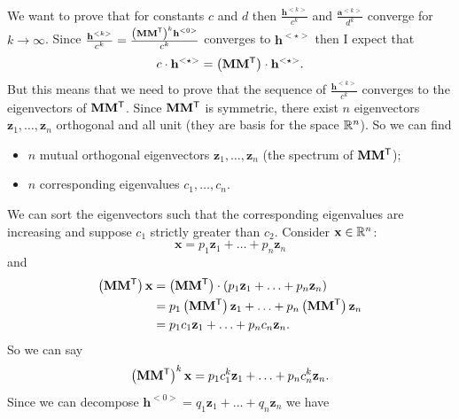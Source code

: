 \documentclass[a4paper,9pt]{extarticle}
\begin{document}
\begin{multicols*}{2}
\begin{align*}
		\end{align*}
		We want to prove that for constants $c$ and $d$ then $\frac{\mathbf{h}^{<k>}}{c^{k}}$ and $\frac{\mathbf{a}^{<k>}}{d^{k}}$ converge for $k\to\infty$. Since $\frac{\mathbf{h}^{<k>}}{c^{k}}=\frac{\left(\mathbf{M}{\mathbf{M}}^{\mathsf{T}}\right)^{k}\mathbf{h}^{<0>}}{c^{k}}$ converges to $\mathbf{h}^{<\star>}$ then I expect that
		\begin{equation*}
			c\cdot\mathbf{h}^{<\star>}=\left(\mathbf{M}{\mathbf{M}}^{\mathsf{T}}\right)\cdot\mathbf{h}^{<\star>}.
		\end{equation*}
		But this means that we need to prove that the sequence of $\frac{\mathbf{h}^{<k>}}{c^{k}}$ converges to the eigenvectors of $\mathbf{M}{\mathbf{M}}^{\mathsf{T}}$.
		Since $\mathbf{M}{\mathbf{M}}^{\mathsf{T}}$ is symmetric, there exist $n$ eigenvectors $\mathbf{z}_{1},\ldots,\mathbf{z}_{n}$ orthogonal and all unit (they are basis for the space $\mathbb{R}^{n}$). So we can find
		\begin{itemize}
			\item $n$ mutual orthogonal eigenvectors $\mathbf{z}_{1},\ldots,\mathbf{z}_{n}$ (the spectrum of $\mathbf{M}{\mathbf{M}}^{\mathsf{T}}$);
			\item $n$ corresponding eigenvalues $c_{1},\ldots,c_{n}$.
		\end{itemize}
		We can sort the eigenvectors such that the corresponding eigenvalues are increasing and suppose $c_1$ strictly greater than $c_{2}$. Consider $\mathbf{x}\in\mathbb{R}^{n}$:
		\begin{equation*}
			\mathbf{x}=p_{1}\mathbf{z}_{1}+\ldots+p_{n}\mathbf{z}_{n}
		\end{equation*}
		and
		\begin{align*}
			\left(\mathbf{M}{\mathbf{M}}^{\mathsf{T}}\right)\mathbf{x}&=\left(\mathbf{M}{\mathbf{M}}^{\mathsf{T}}\right)\cdot\left(p_{1}\mathbf{z}_{1}+\ldots+p_{n}\mathbf{z}_{n}\right)\\
		&=p_{1}	\left(\mathbf{M}{\mathbf{M}}^{\mathsf{T}}\right)\mathbf{z}_{1}+\ldots+p_{n}	\left(\mathbf{M}{\mathbf{M}}^{\mathsf{T}}\right)\mathbf{z}_{n}\\
		&=p_{1}c_{1}\mathbf{z}_{1}+\ldots+p_{n}c_{n}\mathbf{z}_{n}.
		\end{align*}
		So we can say
		\begin{equation*}
			\left(\mathbf{M}{\mathbf{M}}^{\mathsf{T}}\right)^{k}\mathbf{x}=p_{1}c_{1}^{k}\mathbf{z}_{1}+\ldots+p_{n}c_{n}^{k}\mathbf{z}_{n}.
		\end{equation*}
		Since we can decompose $\mathbf{h}^{<0>}=q_{1}\mathbf{z}_{1}+\ldots+q_{n}\mathbf{z}_{n}$ we have

\end{multicols*}
\end{document}
